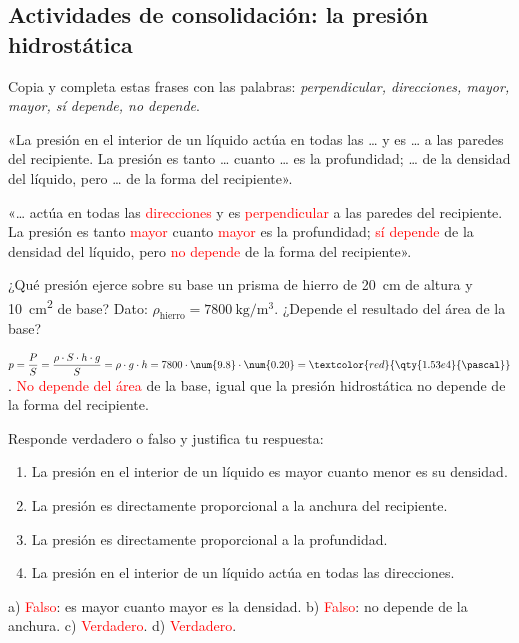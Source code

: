 \subsection*{Actividades de consolidación: la presión hidrostática}

\begin{exercise}
    Copia y completa estas frases con las palabras: \emph{perpendicular, direcciones, mayor, mayor, sí depende, no depende}.

    «La presión en el interior de un líquido actúa en todas las \ldots{} y es \ldots{} a las paredes del recipiente. La presión es tanto \ldots{} cuanto \ldots{} es la profundidad; \ldots{} de la densidad del líquido, pero \ldots{} de la forma del recipiente».
    \begin{solu}
        «\ldots{} actúa en todas las \textcolor{red}{direcciones} y es \textcolor{red}{perpendicular} a las paredes del recipiente. La presión es tanto \textcolor{red}{mayor} cuanto \textcolor{red}{mayor} es la profundidad; \textcolor{red}{sí depende} de la densidad del líquido, pero \textcolor{red}{no depende} de la forma del recipiente».
    \end{solu}
\end{exercise}

\begin{exercise}
    ¿Qué presión ejerce sobre su base un prisma de hierro de \qty{20}{\cm} de altura y \qty{10}{\square\cm} de base? Dato: \(\rho_{\text{hierro}} = \qty{7800}{\kg\per\cubic\m}\). ¿Depende el resultado del área de la base?
    \begin{solu}
        \(p = \dfrac{P}{S} = \dfrac{\rho \cdot S \cdot h \cdot g}{S} = \rho \cdot g \cdot h = 7800 \cdot \num{9.8} \cdot \num{0.20} = \textcolor{red}{\qty{1.53e4}{\pascal}}\).
        \textcolor{red}{No depende del área} de la base, igual que la presión hidrostática no depende de la forma del recipiente.
    \end{solu}
\end{exercise}

\begin{exercise}
    Responde verdadero o falso y justifica tu respuesta:
    \begin{enumerate}[label=\alph*)]
        \item La presión en el interior de un líquido es mayor cuanto menor es su densidad.
        \item La presión es directamente proporcional a la anchura del recipiente.
        \item La presión es directamente proporcional a la profundidad.
        \item La presión en el interior de un líquido actúa en todas las direcciones.
    \end{enumerate}
    \begin{solu}
        a) \textcolor{red}{Falso}: es mayor cuanto mayor es la densidad. b) \textcolor{red}{Falso}: no depende de la anchura. c) \textcolor{red}{Verdadero}. d) \textcolor{red}{Verdadero}.
    \end{solu}
\end{exercise}

